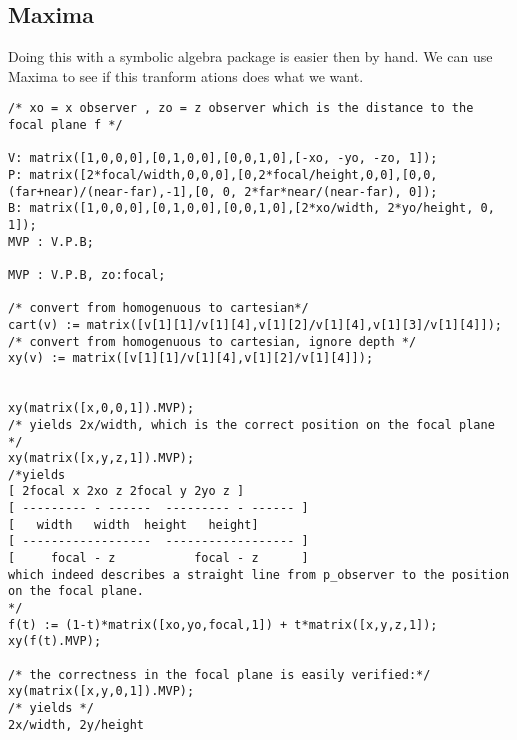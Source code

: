 \documentclass{article}
\begin{document}
\subsection{Maxima}
Doing this with a symbolic algebra package is easier then by hand. We can use Maxima 
to see if this tranform ations does what we want.
\begin{verbatim}
/* xo = x observer , zo = z observer which is the distance to the focal plane f */

V: matrix([1,0,0,0],[0,1,0,0],[0,0,1,0],[-xo, -yo, -zo, 1]);
P: matrix([2*focal/width,0,0,0],[0,2*focal/height,0,0],[0,0,(far+near)/(near-far),-1],[0, 0, 2*far*near/(near-far), 0]);
B: matrix([1,0,0,0],[0,1,0,0],[0,0,1,0],[2*xo/width, 2*yo/height, 0, 1]);
MVP : V.P.B;

MVP : V.P.B, zo:focal;

/* convert from homogenuous to cartesian*/
cart(v) := matrix([v[1][1]/v[1][4],v[1][2]/v[1][4],v[1][3]/v[1][4]]);
/* convert from homogenuous to cartesian, ignore depth */
xy(v) := matrix([v[1][1]/v[1][4],v[1][2]/v[1][4]]);


xy(matrix([x,0,0,1]).MVP);
/* yields 2x/width, which is the correct position on the focal plane */
xy(matrix([x,y,z,1]).MVP);
/*yields
[ 2focal x 2xo z 2focal y 2yo z ]
[ --------- - ------  --------- - ------ ]
[   width   width  height   height]
[ ------------------  ------------------ ]
[     focal - z           focal - z      ]
which indeed describes a straight line from p_observer to the position on the focal plane.
*/
f(t) := (1-t)*matrix([xo,yo,focal,1]) + t*matrix([x,y,z,1]);
xy(f(t).MVP);

/* the correctness in the focal plane is easily verified:*/
xy(matrix([x,y,0,1]).MVP);
/* yields */
2x/width, 2y/height
\end{verbatim}
\end{document}
